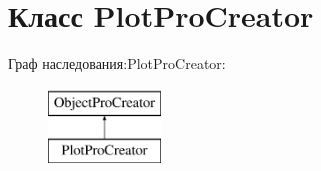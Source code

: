 \hypertarget{classPlotProCreator}{\section{Класс \-Plot\-Pro\-Creator}
\label{classPlotProCreator}
}
Граф наследования\-:\-Plot\-Pro\-Creator\-:\begin{figure}[H]
\begin{center}
\leavevmode
\includegraphics[height=2.000000cm]{classPlotProCreator}
\end{center}
\end{figure}
